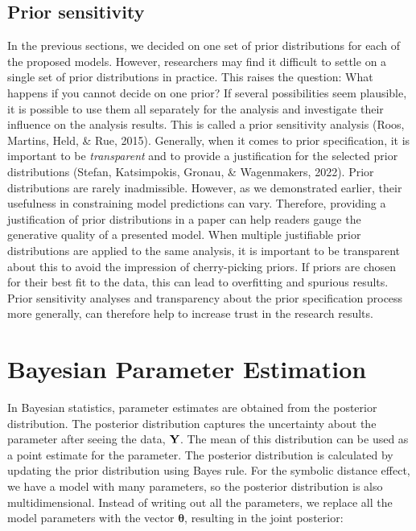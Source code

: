 \documentclass[
  english,
  doc,floatsintext]{apa6}
\begin{document}
\hypertarget{prior-sensitivity}{%
\subsection{Prior sensitivity}\label{prior-sensitivity}}

In the previous sections, we decided on one set of prior distributions for each of the proposed models. However, researchers may find it difficult to settle on a single set of prior distributions in practice. This raises the question: What happens if you cannot decide on one prior? If several possibilities seem plausible, it is possible to use them all separately for the analysis and investigate their influence on the analysis results. This is called a prior sensitivity analysis (Roos, Martins, Held, \& Rue, 2015). Generally, when it comes to prior specification, it is important to be \emph{transparent} and to provide a justification for the selected prior distributions (Stefan, Katsimpokis, Gronau, \& Wagenmakers, 2022). Prior distributions are rarely inadmissible. However, as we demonstrated earlier, their usefulness in constraining model predictions can vary. Therefore, providing a justification of prior distributions in a paper can help readers gauge the generative quality of a presented model. When multiple justifiable prior distributions are applied to the same analysis, it is important to be transparent about this to avoid the impression of cherry-picking priors. If priors are chosen for their best fit to the data, this can lead to overfitting and spurious results. Prior sensitivity analyses and transparency about the prior specification process more generally, can therefore help to increase trust in the research results.

\hypertarget{bayesian-parameter-estimation}{%
\section{Bayesian Parameter Estimation}\label{bayesian-parameter-estimation}}

In Bayesian statistics, parameter estimates are obtained from the posterior distribution. The posterior distribution captures the uncertainty about the parameter after seeing the data, \(\bf{Y}\). The mean of this distribution can be used as a point estimate for the parameter. The posterior distribution is calculated by updating the prior distribution using Bayes rule. For the symbolic distance effect, we have a model with many parameters, so the posterior distribution is also multidimensional. Instead of writing out all the parameters, we replace all the model parameters with the vector \(\bm{\theta}\), resulting in the joint posterior:
\end{document}
